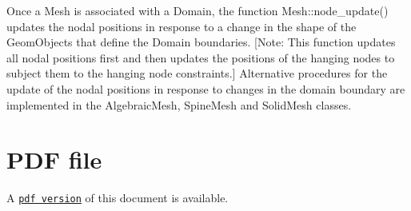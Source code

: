 Once a {\ttfamily Mesh} is associated with a {\ttfamily Domain}, the function {\ttfamily Mesh\+::node\+\_\+update()} updates the nodal positions in response to a change in the shape of the {\ttfamily Geom\+Objects} that define the {\ttfamily Domain} boundaries. \mbox{[}Note\+: This function updates all nodal positions first and then updates the positions of the hanging nodes to subject them to the hanging node constraints.\mbox{]} Alternative procedures for the update of the nodal positions in response to changes in the domain boundary are implemented in the {\ttfamily Algebraic\+Mesh}, {\ttfamily Spine\+Mesh} and {\ttfamily Solid\+Mesh} classes.



 

 \hypertarget{index_pdf}{}\section{P\+D\+F file}\label{index_pdf}
A \href{../latex/refman.pdf}{\tt pdf version} of this document is available. 
